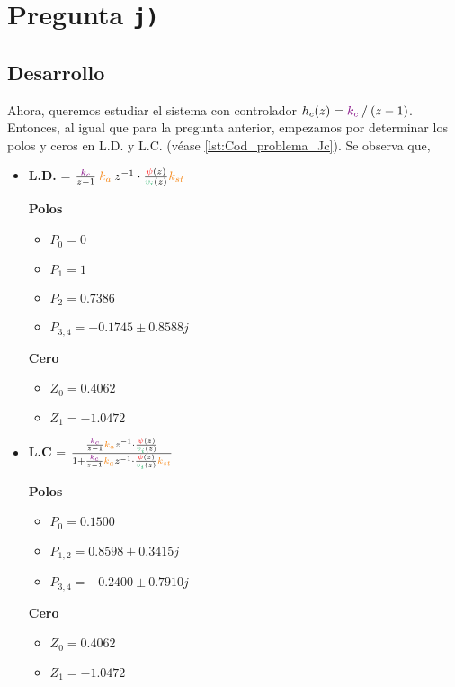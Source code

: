 \section{Pregunta \texttt{j)}}\label{pregunta-j}
\subsection{Desarrollo}

Ahora, queremos estudiar el sistema con controlador $h_{c}(z) = \mathbin{\color{violet}k_{c}} \mathbin{/} (z-1)$.
Entonces, al igual que para la pregunta anterior, empezamos por determinar los
polos y ceros en L.D. y L.C. (véase \autoref{lst:Cod_problema_Jc}). Se observa
que,

\begin{itemize}
  \item \textbf{L.D.} = \( \frac{\mora{k_{c}}}{z-1} \nara{ k_{a}} z^{-1} \cdot \frac{\rojo{\psi}(z)}{\verd{v_i}(z)} \nara{k_{st}} \) 
  
  \begin{multicols}{2}
    \textbf{Polos}
    \begin{itemize}
      \item \(P_{0} = 0 \)
      \item \(P_{1} = 1 \)
      \item \(P_{2} = 0.7386\)
      \item \(P_{3,4} = -0.1745 \pm 0.8588j\) 
    \end{itemize}
    \columnbreak
    \textbf{Cero}
    \begin{itemize}
        \item \(Z_0 = 0.4062\)
        \item \(Z_1 = -1.0472\)
    \end{itemize}
  \end{multicols}
  
  
  \item \textbf{L.C} =  \(\frac{ \frac{\mora{k_{c}}}{z-1} \nara{ k_{a}} z^{-1} \cdot \frac{\rojo{\psi}(z)}{\verd{v_i}(z)}} {1+ \frac{\mora{k_{c}}}{z-1} \nara{ k_{a}} z^{-1} \cdot \frac{\rojo{\psi}(z)}{\verd{v_i}(z)} \nara{k_{st}} }  \)
  
  \begin{multicols}{2}
    \textbf{Polos}
    \begin{itemize}
      \item \(P_{0} = 0.1500 \)
      \item \(P_{1,2} = 0.8598 \pm 0.3415j\)
      \item \(P_{3,4} = -0.2400 \pm 0.7910j\)
    \end{itemize}
    \columnbreak
    \textbf{Cero}
    \begin{itemize}
        \item \(Z_0 = 0.4062\)
        \item \(Z_1 = -1.0472\)
    \end{itemize}
  \end{multicols}
\end{itemize}

